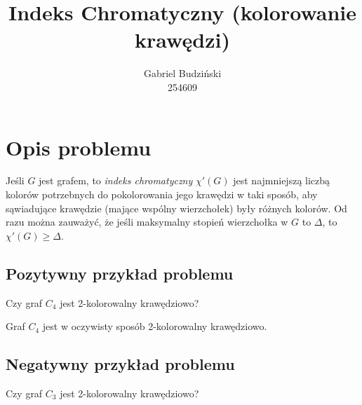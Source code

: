 \documentclass[12pt]{article}
\title{Indeks Chromatyczny (kolorowanie krawędzi)}
\author{Gabriel Budziński\\254609}
\begin{document}
\maketitle

\section{Opis problemu}

Jeśli $G$ jest grafem, to \textit{indeks chromatyczny} $\chi'(G)$ jest najmniejszą liczbą kolorów potrzebnych do pokolorowania jego krawędzi w taki sposób, aby sąwiadujące krawędzie (mające wspólny wierzchołek) były różnych kolorów. Od razu można zauważyć, że jeśli maksymalny stopień wierzchołka w $G$ to $\Delta$, to $\chi'(G) \geq \Delta$.

\subsection{Pozytywny przykład problemu}

Czy graf $C_4$ jest 2-kolorowalny krawędziowo?

\begin{center}
\end{center}

Graf $C_4$ jest w oczywisty sposób 2-kolorowalny krawędziowo.

\subsection{Negatywny przykład problemu}

Czy graf $C_3$ jest 2-kolorowalny krawędziowo?

\begin{center}
\end{center}
\end{document}
